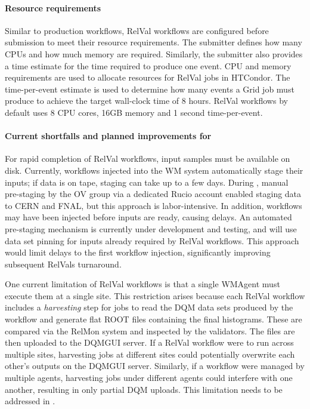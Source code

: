 \paragraph*{Resource requirements}
Similar to production workflows, \gls{RelVal} workflows are configured before submission to meet their resource requirements. The submitter defines how many \glspl{CPU} and how much memory are required. Similarly, the submitter also provides a time estimate for the time required to produce one event. \gls{CPU} and memory requirements are used to allocate resources for \gls{RelVal} jobs in HTCondor. The time-per-event estimate is used to determine how many events a Grid job must produce to achieve the target wall-clock time of 8 hours. \gls{RelVal} workflows by default uses 8 \gls{CPU} cores, 16\unit{GB} memory and 1 second time-per-event. 

\paragraph*{Current shortfalls and planned improvements for \PhaseTwo}
For rapid completion of \gls{RelVal} workflows, input samples must be available on disk. Currently, workflows injected into the \gls{WM} system automatically stage their inputs; if data is on tape, staging can take up to a few days. During \RunThree, manual pre-staging by the \gls{OV} group via a dedicated Rucio account enabled staging data to CERN and \gls{FNAL}, but this approach is labor-intensive. In addition, workflows may have been injected before inputs are ready, causing delays. An automated pre-staging mechanism is currently under development and testing, and will use data set pinning for inputs already required by \gls{RelVal} workflows. This approach would limit delays to the first workflow injection, significantly improving subsequent \glspl{RelVal} turnaround.

One current limitation of \gls{RelVal} workflows is that a single WMAgent must execute them at a single site. This restriction arises because each \gls{RelVal} workflow includes a \emph{harvesting} step for jobs to read the \gls{DQM} data sets produced by the workflow and generate flat \textsc{ROOT} files containing the final histograms. These are compared via the \gls{RelMon} system and inspected by the validators. The files are then uploaded to the \gls{DQMGUI} server. If a \gls{RelVal} workflow were to run across multiple sites, harvesting jobs at different sites could potentially overwrite each other's outputs on the \gls{DQMGUI} server. Similarly, if a workflow were managed by multiple agents, harvesting jobs under different agents could interfere with one another, resulting in only partial \gls{DQM} uploads. This limitation needs to be addressed in \PhaseTwo.

